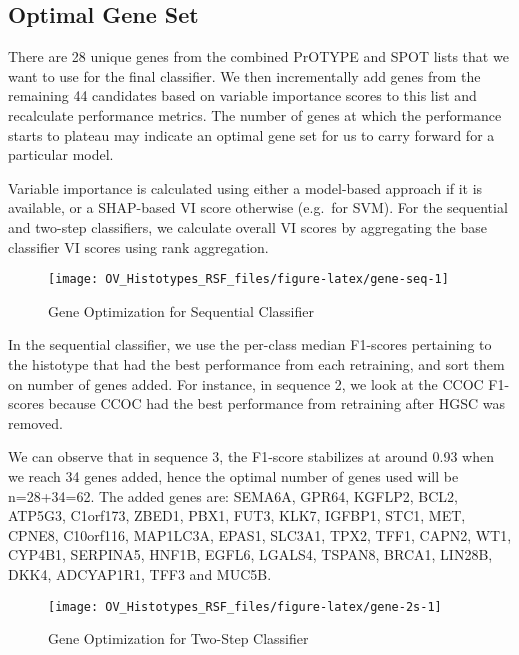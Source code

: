 \documentclass[
]{report}
\begin{document}
\hypertarget{optimal-gene-set}{%
\subsection{Optimal Gene Set}\label{optimal-gene-set}}

There are 28 unique genes from the combined PrOTYPE and SPOT lists that we want to use for the final classifier. We then incrementally add genes from the remaining 44 candidates based on variable importance scores to this list and recalculate performance metrics. The number of genes at which the performance starts to plateau may indicate an optimal gene set for us to carry forward for a particular model.

Variable importance is calculated using either a model-based approach if it is available, or a SHAP-based VI score otherwise (e.g.~for SVM). For the sequential and two-step classifiers, we calculate overall VI scores by aggregating the base classifier VI scores using rank aggregation.

\begin{figure}[H]

{\centering \texttt{[image: OV\_Histotypes\_RSF\_files/figure-latex/gene-seq-1]} 

}

\caption{Gene Optimization for Sequential Classifier}\label{fig:gene-seq}
\end{figure}

In the sequential classifier, we use the per-class median F1-scores pertaining to the histotype that had the best performance from each retraining, and sort them on number of genes added. For instance, in sequence 2, we look at the CCOC F1-scores because CCOC had the best performance from retraining after HGSC was removed.

We can observe that in sequence 3, the F1-score stabilizes at around 0.93 when we reach 34 genes added, hence the optimal number of genes used will be n=28+34=62. The added genes are: SEMA6A, GPR64, KGFLP2, BCL2, ATP5G3, C1orf173, ZBED1, PBX1, FUT3, KLK7, IGFBP1, STC1, MET, CPNE8, C10orf116, MAP1LC3A, EPAS1, SLC3A1, TPX2, TFF1, CAPN2, WT1, CYP4B1, SERPINA5, HNF1B, EGFL6, LGALS4, TSPAN8, BRCA1, LIN28B, DKK4, ADCYAP1R1, TFF3 and MUC5B.

\begin{figure}[H]

{\centering \texttt{[image: OV\_Histotypes\_RSF\_files/figure-latex/gene-2s-1]} 

}

\caption{Gene Optimization for Two-Step Classifier}\label{fig:gene-2s}
\end{figure}
\end{document}
